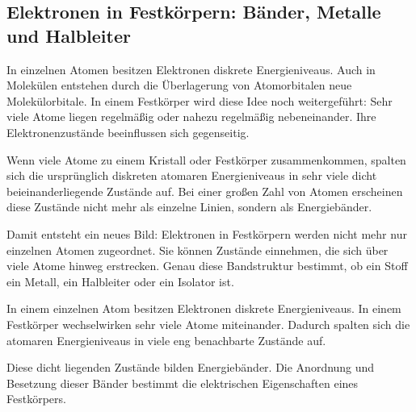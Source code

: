 \subsection{Elektronen in Festkörpern: Bänder, Metalle und Halbleiter}
\label{subsec:elektronen-festkoerper-baender-metalle-halbleiter}

In einzelnen Atomen besitzen Elektronen diskrete Energieniveaus. Auch in
Molekülen entstehen durch die Überlagerung von Atomorbitalen neue
Molekülorbitale. In einem Festkörper wird diese Idee noch
weitergeführt: Sehr viele Atome liegen regelmäßig oder nahezu regelmäßig
nebeneinander. Ihre Elektronenzustände beeinflussen sich gegenseitig.

Wenn viele Atome zu einem Kristall oder Festkörper
zusammenkommen, spalten sich die ursprünglich diskreten atomaren Energieniveaus
in sehr viele dicht beieinanderliegende Zustände auf. Bei einer großen Zahl von
Atomen erscheinen diese Zustände nicht mehr als einzelne Linien, sondern als
Energiebänder.

Damit entsteht ein neues Bild: Elektronen in Festkörpern werden nicht mehr nur
einzelnen Atomen zugeordnet. Sie können Zustände einnehmen, die sich über viele
Atome hinweg erstrecken. Genau diese Bandstruktur bestimmt, ob ein Stoff ein
Metall, ein Halbleiter oder ein Isolator
 ist.

\begin{PhysicsBox}
	\label{box:energiebaender-im-festkoerper}
	In einem einzelnen Atom besitzen Elektronen diskrete Energieniveaus. In einem
	Festkörper wechselwirken sehr viele Atome miteinander. Dadurch spalten sich
	die atomaren Energieniveaus in viele eng benachbarte Zustände auf.
	
	Diese dicht liegenden Zustände bilden Energiebänder. Die Anordnung und
	Besetzung dieser Bänder bestimmt die elektrischen Eigenschaften eines
	Festkörpers.
\end{PhysicsBox}

